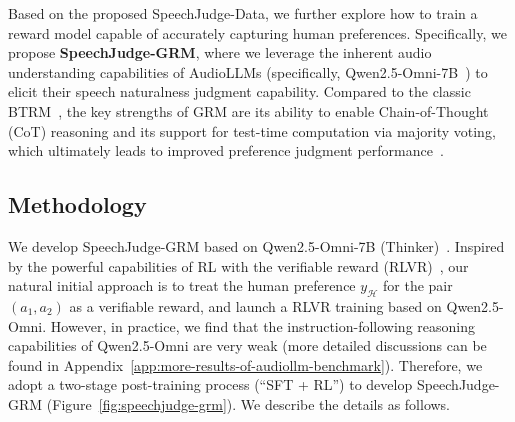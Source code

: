 \documentclass[]{bytedance_seed}
\begin{document}
Based on the proposed SpeechJudge-Data, we further explore how to train a reward model capable of accurately capturing human preferences. Specifically, we propose \textbf{SpeechJudge-GRM}, where we leverage the inherent audio understanding capabilities of AudioLLMs (specifically, Qwen2.5-Omni-7B~\citep{qwen2.5-omni}) to elicit their speech naturalness judgment capability. Compared to the classic BTRM~\citep{bt-rm}, the key strengths of GRM are its ability to enable Chain-of-Thought (CoT) reasoning and its support for test-time computation via majority voting, which ultimately leads to improved preference judgment performance~\citep{google-grm}.



\subsection{Methodology}
We develop SpeechJudge-GRM based on Qwen2.5-Omni-7B (Thinker)~\citep{qwen2.5-omni}. Inspired by the powerful capabilities of RL with the verifiable reward (RLVR)~\citep{grpo,deepseek-r1}, our natural initial approach is to treat the human preference $y_{\mathcal{H}}$ for the pair $(a_1, a_2)$ as a verifiable reward, and launch a RLVR training based on Qwen2.5-Omni.
However, in practice, we find that the instruction-following reasoning capabilities of Qwen2.5-Omni are very weak (more detailed discussions can be found in Appendix~\ref{app:more-results-of-audiollm-benchmark}). Therefore, we adopt a two-stage post-training process (``SFT + RL'') to develop SpeechJudge-GRM (Figure~\ref{fig:speechjudge-grm}). We describe the details as follows.
\end{document}
